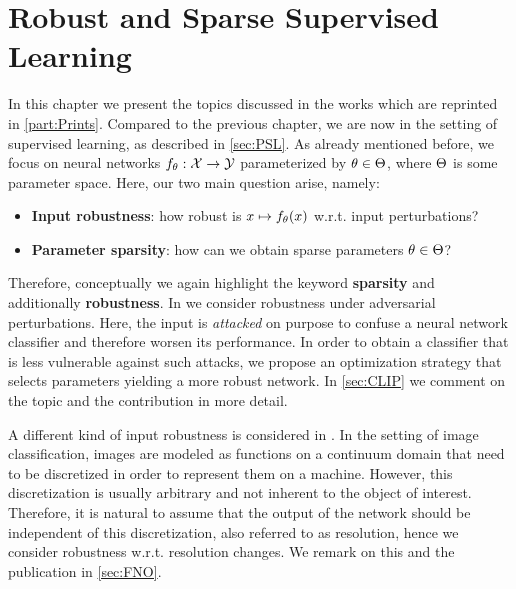 \chapter{Robust and Sparse Supervised Learning}\label{ch:SL}
%
%
In this chapter we present the topics discussed in the works \cite{bungert2021clip, kabri2023resolution, bungert2022bregman} which are reprinted in \cref{part:Prints}. Compared to the previous chapter, we are now in the setting of supervised learning, as described in \cref{sec:PSL}. As already mentioned before, we focus on neural networks $f_\theta:\mathcal{X}\to\mathcal{\mathcal{Y}}$ parameterized by $\theta\in\Theta$, where $\Theta$ is some parameter space. Here, our two main question arise, namely:
\begin{itemize}
\item \textbf{Input robustness}: how robust is $x\mapsto f_\theta(x)$ w.r.t. input perturbations? 
\item \textbf{Parameter sparsity}: how can we obtain sparse parameters $\theta\in\Theta$?
\end{itemize}
%
%
\begin{center}%
\end{center}
%
%
Therefore, conceptually we again highlight the keyword \textbf{sparsity} and additionally \textbf{robustness}. In \cite{bungert2021clip} we consider robustness under adversarial perturbations. Here, the input is \emph{attacked} on purpose to confuse a neural network classifier and therefore worsen its performance. In order to obtain a classifier that is less vulnerable against such attacks, we propose an optimization strategy that selects parameters yielding a more robust network. In \cref{sec:CLIP} we comment on the topic and the contribution in more detail. 

A different kind of input robustness is considered in \cite{kabri2023resolution}. In the setting of image classification, images are modeled as functions on a continuum domain that need to be discretized in order to represent them on a machine. However, this discretization is usually arbitrary and not inherent to the object of interest. Therefore, it is natural to assume that the output of the network should be independent of this discretization, also referred to as resolution, hence we consider robustness w.r.t. resolution changes. We remark on this and the publication in \cref{sec:FNO}.

